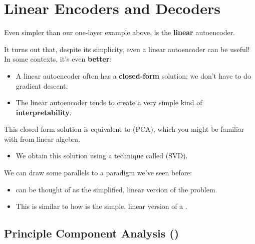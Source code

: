         

        

    \pagebreak

\section{Linear Encoders and Decoders}

    Even simpler than our one-layer example above, is the \textbf{linear} autoencoder.

    It turns out that, despite its simplicity, even a linear autoencoder can be useful! In some contexts, it's even \textbf{better}:

    \begin{itemize}
        \item A linear autoencoder often has a \textbf{closed-form} solution: we don't have to do gradient descent.
        \item The linear autoencoder tends to create a very simple kind of \textbf{interpretability}.
    \end{itemize}

    This closed form solution is equivalent to  (PCA), which you might be familiar with from linear algebra.

    \begin{itemize}
        \item We obtain this solution using a technique called  (SVD).
    \end{itemize}

    \subsecdiv

    We can draw some parallels to a paradigm we've seen before:

    \begin{itemize}
        \item {} can be thought of as the simplified, linear version of the  problem. 
        \item This is similar to how  is the simple, linear version of a .
    \end{itemize}

    \pagebreak

    \subsection{Principle Component Analysis ()}

